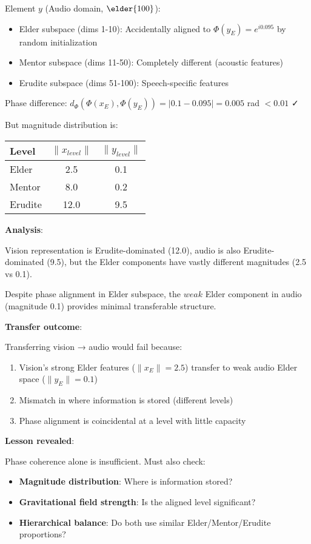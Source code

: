 Element $y$ (Audio domain, $\elder{100}$):
\begin{itemize}
\item Elder subspace (dims 1-10): Accidentally aligned to $\Phi(y_E) = e^{i0.095}$ by random initialization
\item Mentor subspace (dims 11-50): Completely different (acoustic features)
\item Erudite subspace (dims 51-100): Speech-specific features
\end{itemize}

Phase difference: $d_{\Phi}(\Phi(x_E), \Phi(y_E)) = |0.1 - 0.095| = 0.005$ rad $< 0.01$ ✓

But magnitude distribution is:
\begin{center}
\begin{tabular}{|l|c|c|}
\hline
Level & $\|x_{level}\|$ & $\|y_{level}\|$ \\
\hline
Elder & 2.5 & 0.1 \\
Mentor & 8.0 & 0.2 \\
Erudite & 12.0 & 9.5 \\
\hline
\end{tabular}
\end{center}

\textbf{Analysis}:

Vision representation is Erudite-dominated (12.0), audio is also Erudite-dominated (9.5), but the Elder components have vastly different magnitudes (2.5 vs 0.1).

Despite phase alignment in Elder subspace, the $weak$ Elder component in audio (magnitude 0.1) provides minimal transferable structure.

\textbf{Transfer outcome}:

Transferring vision → audio would fail because:
\begin{enumerate}
\item Vision's strong Elder features ($\|x_E\| = 2.5$) transfer to weak audio Elder space ($\|y_E\| = 0.1$)
\item Mismatch in where information is stored (different levels)
\item Phase alignment is coincidental at a level with little capacity
\end{enumerate}

\textbf{Lesson revealed}:

Phase coherence alone is insufficient. Must also check:
\begin{itemize}
\item \textbf{Magnitude distribution}: Where is information stored?
\item \textbf{Gravitational field strength}: Is the aligned level significant?
\item \textbf{Hierarchical balance}: Do both use similar Elder/Mentor/Erudite proportions?
\end{itemize}

